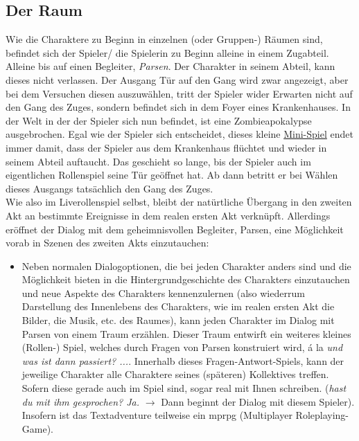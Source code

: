\documentclass[a4paper, 12pt]{scrartcl}
\begin{document}
    \subsection{Der Raum} \label{der-raum}
    Wie die Charaktere zu Beginn in einzelnen (oder Gruppen-) Räumen sind, befindet sich der Spieler/ die Spielerin zu Beginn alleine in einem Zugabteil. 
    Alleine bis auf einen Begleiter, \textit{Parsen}.
    Der Charakter in seinem Abteil, kann dieses nicht verlassen. 
    Der Ausgang \glqq Tür auf den Gang\grqq{} wird zwar angezeigt, aber bei dem Versuchen diesen auszuwählen, tritt der Spieler wider Erwarten nicht auf den Gang des Zuges, sondern befindet sich in dem Foyer eines Krankenhauses. 
    In der Welt in der der Spieler sich nun befindet, ist eine Zombieapokalypse ausgebrochen. 
    Egal wie der Spieler sich entscheidet, dieses kleine \hyperref[zombieapokalypse]{Mini-Spiel} endet immer damit, dass der Spieler aus dem Krankenhaus flüchtet und wieder in seinem Abteil auftaucht.
    Das geschieht so lange, bis der Spieler auch im eigentlichen Rollenspiel seine Tür geöffnet hat.
    Ab dann betritt er bei Wählen dieses Ausgangs tatsächlich den Gang des Zuges.\\
    Wie also im Liverollenspiel selbst, bleibt der \glqq natürtliche\grqq{} Übergang in den zweiten Akt an bestimmte Ereignisse in dem \glqq realen\grqq{} ersten Akt verknüpft. 
    Allerdings eröffnet der Dialog mit dem geheimnisvollen Begleiter, Parsen, eine Möglichkeit vorab in Szenen des zweiten Akts einzutauchen: 
    \begin{itemize}
    \item[] Neben normalen Dialogoptionen, die bei jeden Charakter anders sind und die Möglichkeit bieten in die Hintergrundgeschichte des Charakters einzutauchen und neue Aspekte des Charakters kennenzulernen (also wiederrum Darstellung des Innenlebens des Charakters, wie im realen ersten Akt die Bilder, die Musik, etc. des Raumes), kann jeden Charakter im Dialog mit Parsen von einem Traum erzählen. 
    Dieser Traum entwirft ein weiteres kleines (Rollen-) Spiel, welches durch Fragen von Parsen konstruiert wird, á la \textit{und was ist dann passiert? ...}. 
    Innerhalb dieses Fragen-Antwort-Spiels, kann der jeweilige Charakter alle Charaktere seines (späteren) Kollektives treffen.
    Sofern diese gerade auch im Spiel sind, sogar real mit Ihnen schreiben. (\textit{\frqq hast du mit ihm gesprochen?\flqq{} \frqq Ja\flqq.} $\rightarrow$ Dann beginnt der Dialog mit diesem Spieler).
    Insofern ist das Textadventure teilweise ein mprpg (Multiplayer Roleplaying-Game).
    \end{itemize}
\end{document}
